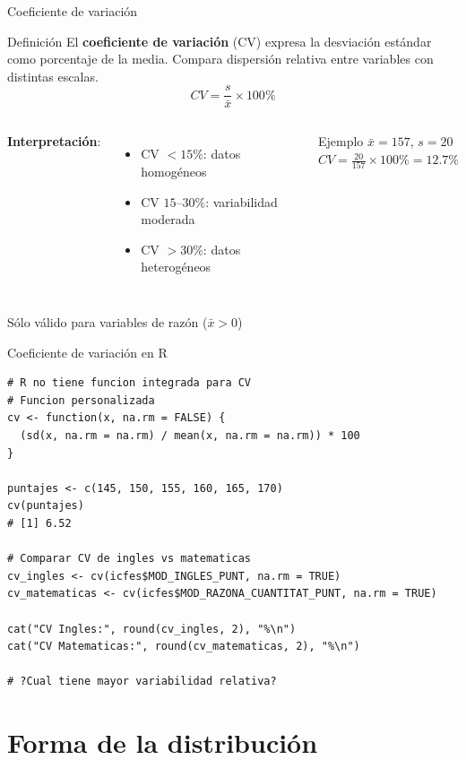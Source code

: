 \documentclass[aspectratio=169, 11pt]{beamer}
\begin{document}
\begin{frame}{Coeficiente de variación}
\begin{block}{Definición}
El \textbf{coeficiente de variación} (CV) expresa la desviación estándar como porcentaje de la media. Compara dispersión relativa entre variables con distintas escalas.
\[
CV = \frac{s}{\bar{x}} \times 100\%
\]
\end{block}

\begin{columns}[T]
\textbf{Interpretación}:
\begin{itemize}
\item CV $< 15\%$: datos homogéneos
\item CV $15$--$30\%$: variabilidad moderada
\item CV $> 30\%$: datos heterogéneos
\end{itemize}

\begin{exampleblock}{Ejemplo}
$\bar{x} = 157$, $s = 20$\\[0.3em]
$CV = \frac{20}{157} \times 100\% = 12.7\%$
\end{exampleblock}
\end{columns}

\vspace{0.3em}
\alert{Sólo válido para variables de razón} ($\bar{x} > 0$)
\end{frame}

\begin{frame}[fragile]{Coeficiente de variación en R}
\begin{lstlisting}
# R no tiene funcion integrada para CV
# Funcion personalizada
cv <- function(x, na.rm = FALSE) {
  (sd(x, na.rm = na.rm) / mean(x, na.rm = na.rm)) * 100
}

puntajes <- c(145, 150, 155, 160, 165, 170)
cv(puntajes)
# [1] 6.52

# Comparar CV de ingles vs matematicas
cv_ingles <- cv(icfes$MOD_INGLES_PUNT, na.rm = TRUE)
cv_matematicas <- cv(icfes$MOD_RAZONA_CUANTITAT_PUNT, na.rm = TRUE)

cat("CV Ingles:", round(cv_ingles, 2), "%\n")
cat("CV Matematicas:", round(cv_matematicas, 2), "%\n")

# ?Cual tiene mayor variabilidad relativa?
\end{lstlisting}
\end{frame}

\section{Forma de la distribución}
\end{document}
